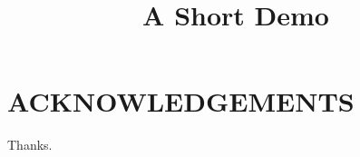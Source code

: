 \documentclass[article]{jss}
\title{A Short Demo}
\begin{document}
\section*{ACKNOWLEDGEMENTS}
Thanks.
\end{document}
